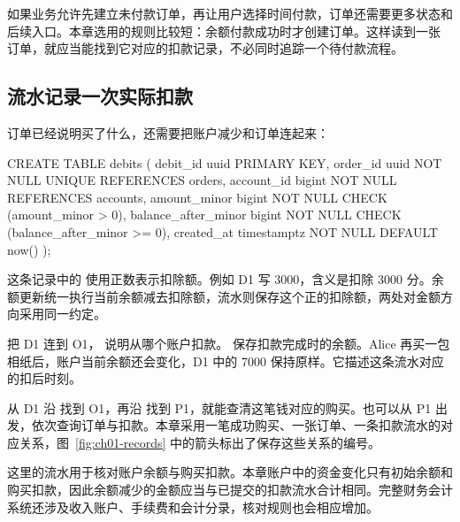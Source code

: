 如果业务允许先建立未付款订单，再让用户选择时间付款，订单还需要更多状态和后续入口。本章选用的规则比较短：余额付款成功时才创建订单。这样读到一张  订单，就应当能找到它对应的扣款记录，不必同时追踪一个待付款流程。

\subsection*{流水记录一次实际扣款}

订单已经说明买了什么，还需要把账户减少和订单连起来：

\begin{BookCode}
CREATE TABLE debits (
    debit_id      uuid PRIMARY KEY,
    order_id      uuid NOT NULL UNIQUE REFERENCES orders,
    account_id    bigint NOT NULL REFERENCES accounts,
    amount_minor  bigint NOT NULL CHECK (amount_minor > 0),
    balance_after_minor bigint NOT NULL
        CHECK (balance_after_minor >= 0),
    created_at    timestamptz NOT NULL DEFAULT now()
);
\end{BookCode}

这条记录中的  使用正数表示扣除额。例如 D1 写 3000，含义是扣除 3000 分。余额更新统一执行当前余额减去扣除额，流水则保存这个正的扣除额，两处对金额方向采用同一约定。

 把 D1 连到 O1， 说明从哪个账户扣款。 保存扣款完成时的余额。Alice 再买一包相纸后，账户当前余额还会变化，D1 中的 7000 保持原样。它描述这条流水对应的扣后时刻。

从 D1 沿  找到 O1，再沿  找到 P1，就能查清这笔钱对应的购买。也可以从 P1 出发，依次查询订单与扣款。本章采用一笔成功购买、一张订单、一条扣款流水的对应关系，图~\ref{fig:ch01-records} 中的箭头标出了保存这些关系的编号。



这里的流水用于核对账户余额与购买扣款。本章账户中的资金变化只有初始余额和购买扣款，因此余额减少的金额应当与已提交的扣款流水合计相同。完整财务会计系统还涉及收入账户、手续费和会计分录，核对规则也会相应增加。
